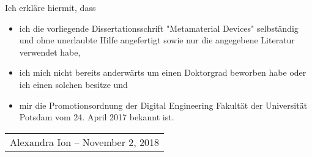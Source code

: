 Ich erkläre hiermit, dass

\begin{itemize}
    \item ich die vorliegende Dissertationsschrift "Metamaterial Devices" selbständig und ohne unerlaubte Hilfe angefertigt sowie nur die angegebene Literatur verwendet habe, 
    \item ich mich nicht bereits anderwärts um einen Doktorgrad beworben habe oder ich einen solchen besitze und 
    \item mir die Promotionsordnung der Digital Engineering Fakultät der Universität Potsdam vom 24. April 2017 bekannt ist.
\end{itemize}

\begin{tabular}{ c }
    \rule{0pt}{60pt} \\
    \hline
    \rule{0pt}{15pt} \hspace{0.5cm} Alexandra Ion -- November 2, 2018 \hspace{0.5cm} \\
\end{tabular}







